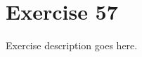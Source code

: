 \section{Exercise 57}
\begin{question}
   Exercise description goes here. 
\end{question}

\begin{solution}
\end{solution}
